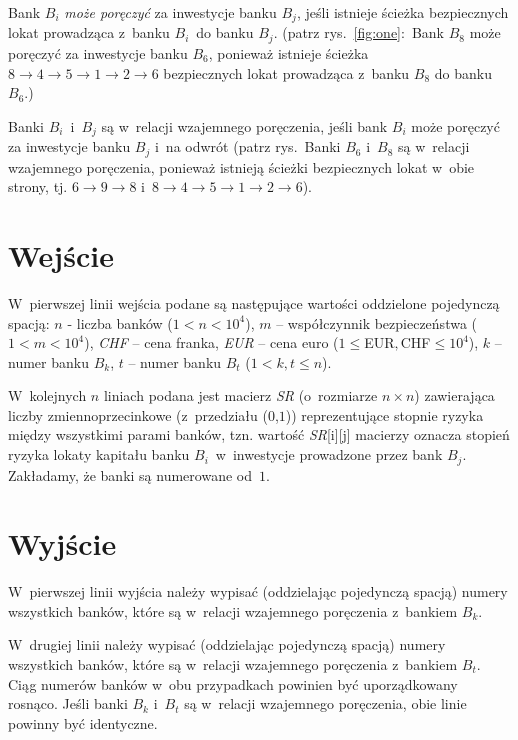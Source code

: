 \documentclass{article}
\begin{document}
Bank $B_{i}$ \textit{może poręczyć} za inwestycje banku $B_{j}$, jeśli istnieje ścieżka bezpiecznych lokat
prowadząca z~banku $B_{i}$~do banku $B_{j}$. (patrz rys.~\ref{fig:one}:~Bank $B_{8}$ może poręczyć za inwestycje banku $B_{6}$, ponieważ istnieje ścieżka $8 \rightarrow 4 \rightarrow 5 \rightarrow 1 \rightarrow 2 \rightarrow 6$ bezpiecznych lokat prowadząca z~banku $B_{8}$ do banku $B_{6}$.)

Banki $B_{i}$~i~$B_{j}$ są w~relacji wzajemnego poręczenia, jeśli bank $B_{i}$ może poręczyć za inwestycje banku $B_{j}$ i~na odwrót (patrz rys.~Banki $B_{6}$ i~$B_{8}$ są w~relacji wzajemnego poręczenia, ponieważ istnieją ścieżki bezpiecznych lokat w~obie strony, tj. $6 \rightarrow 9 \rightarrow 8$ i~$8 \rightarrow 4 \rightarrow 5 \rightarrow 1 \rightarrow 2 \rightarrow 6$).

\section*{Wejście}
W~pierwszej linii wejścia podane są następujące wartości oddzielone pojedynczą spacją: $n$ - liczba banków ($1 < n < 10^4$),
$m$ -- współczynnik bezpieczeństwa ($1 < m < 10^4$), \textit{CHF} -- cena franka, \textit{EUR} -- cena euro ($1 \le $EUR$, $CHF$ \le 10^4$), $k$ -- numer
banku $B_{k}$, $t$ -- numer banku $B_{t}$ ($1 < k, t \leqslant n$).

W~kolejnych $n$ liniach podana jest macierz \textit{SR} (o~rozmiarze $n \times n$) zawierająca liczby zmiennoprzecinkowe (z~przedziału ($0$,$1$))
reprezentujące stopnie ryzyka między wszystkimi parami banków, tzn. wartość \textit{SR}[i][j] macierzy oznacza stopień ryzyka
lokaty kapitału banku $B_{i}$~w~inwestycje prowadzone przez bank $B_{j}$. Zakładamy, że banki są numerowane od~$1$.

\section*{Wyjście}

W~pierwszej linii wyjścia należy wypisać (oddzielając pojedynczą spacją) numery wszystkich banków, które są w~relacji
wzajemnego poręczenia z~bankiem $B_{k}$.

W~drugiej linii należy wypisać (oddzielając pojedynczą spacją) numery wszystkich banków, które są w~relacji
wzajemnego poręczenia z~bankiem $B_{t}$.
Ciąg numerów banków w~obu przypadkach powinien być uporządkowany rosnąco.
Jeśli banki $B_{k}$ i~$B_{t}$ są w~relacji wzajemnego poręczenia, obie linie powinny być identyczne.
\end{document}
